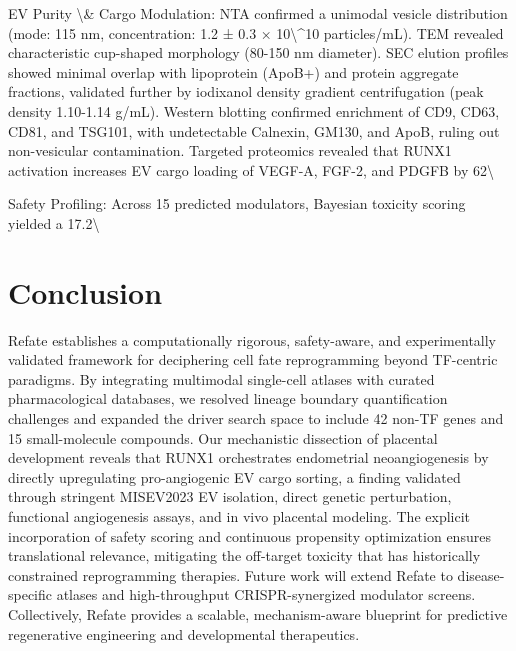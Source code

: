 \documentclass[11pt,a4paper]{article}
\begin{document}
EV Purity \textbackslash{}& Cargo Modulation: NTA confirmed a unimodal vesicle distribution (mode: 115 nm, concentration: 1.2 ± 0.3 × 10\textbackslash{}^{}10 particles/mL). TEM revealed characteristic cup-shaped morphology (80-150 nm diameter). SEC elution profiles showed minimal overlap with lipoprotein (ApoB+) and protein aggregate fractions, validated further by iodixanol density gradient centrifugation (peak density 1.10-1.14 g/mL). Western blotting confirmed enrichment of CD9, CD63, CD81, and TSG101, with undetectable Calnexin, GM130, and ApoB, ruling out non-vesicular contamination. Targeted proteomics revealed that RUNX1 activation increases EV cargo loading of VEGF-A, FGF-2, and PDGFB by 62\textbackslash{}%

Safety Profiling: Across 15 predicted modulators, Bayesian toxicity scoring yielded a 17.2\textbackslash{}%

\section{Conclusion}
Refate establishes a computationally rigorous, safety-aware, and experimentally validated framework for deciphering cell fate reprogramming beyond TF-centric paradigms. By integrating multimodal single-cell atlases with curated pharmacological databases, we resolved lineage boundary quantification challenges and expanded the driver search space to include 42 non-TF genes and 15 small-molecule compounds. Our mechanistic dissection of placental development reveals that RUNX1 orchestrates endometrial neoangiogenesis by directly upregulating pro-angiogenic EV cargo sorting, a finding validated through stringent MISEV2023 EV isolation, direct genetic perturbation, functional angiogenesis assays, and in vivo placental modeling. The explicit incorporation of safety scoring and continuous propensity optimization ensures translational relevance, mitigating the off-target toxicity that has historically constrained reprogramming therapies. Future work will extend Refate to disease-specific atlases and high-throughput CRISPR-synergized modulator screens. Collectively, Refate provides a scalable, mechanism-aware blueprint for predictive regenerative engineering and developmental therapeutics.
\end{document}

